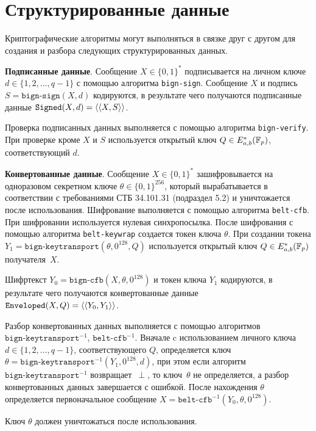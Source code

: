 \section{Структурированные данные}\label{CRYPTO.SignedEnveloped}

Криптографические алгоритмы могут выполняться в связке друг с другом для 
создания и разбора следующих структурированных данных.

{\bf Подписанные данные}.
Сообщение $X \in\{0, 1\}^*$ подписывается на личном ключе 
$d \in\{1, 2,\ldots, q-1\}$ с помощью алгоритма \texttt{bign-sign}.
Сообщение $X$ и подпись $S = \texttt{bign-sign}(X, d)$ кодируются, 
в результате чего получаются подписанные 
данные $\texttt{Signed}(X, d) = \langle\langle X, S \rangle\rangle$.

Проверка подписанных данных выполняется с помощью алгоритма \texttt{bign-verify}.
При проверке кроме $X$ и $S$ используется открытый ключ $Q \in E_{a,b}^*({\mathbb F}_p)$, 
соответствующий $d$.

{\bf Конвертованные данные}.
Сообщение $X\in\{0,1\}^*$ зашифровывается на 
одноразовом секретном ключе $\theta\in\{0,1\}^{256}$, который вырабатывается в 
соответствии с требованиями СТБ 34.101.31 (подраздел 5.2) и уничтожается после 
использования. Шифрование выполняется с помощью алгоритма \texttt{belt-cfb}. При 
шифровании используется нулевая синхропосылка. После шифрования с помощью 
алгоритма \texttt{belt-keywrap} создается токен ключа $\theta$.
При создании токена $Y_1 = \texttt{bign-keytransport}(\theta, 0^{128}, Q)$ 
используется открытый ключ $Q \in E_{a,b}^*({\mathbb F}_p)$ получателя~$X$.

Шифртекст $Y_0 = \texttt{bign-cfb}(X, \theta, 0^{128})$ и токен ключа $Y_1$ 
кодируются, в результате чего получаются конвертованные данные 
$\texttt{Enveloped}(X, Q) = \langle\langle Y_0, Y_1\rangle\rangle$.

Разбор конвертованных данных выполняется с помощью алгоритмов 
$\texttt{bign-keytransport}^{-1}$, $\texttt{belt-cfb}^{-1}$. Вначале c 
использованием личного ключа $d \in\{1, 2,\ldots, q-1\}$, 
соответствующего $Q$, определяется ключ 
$\theta = \texttt{bign-keytransport}^{-1}(Y_1, 0^{128}, d)$, 
при этом если алгоритм~$\texttt{bign-keytransport}^{-1}$ возвращает~$\perp$, 
то ключ~$\theta$ не определяется, а разбор конвертованных данных завершается с 
ошибкой. После нахождения $\theta$ определяется первоначальное сообщение 
$X = \texttt{belt-cfb}^{-1}(Y_0, \theta, 0^{128})$.

Ключ $\theta$ должен уничтожаться после использования.

